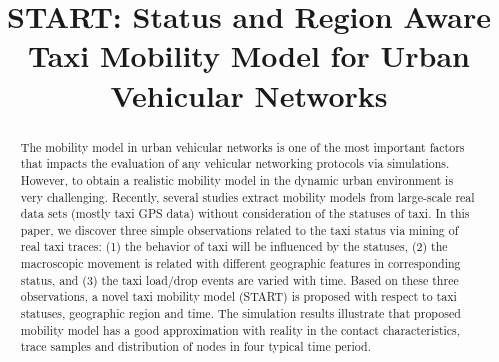 \documentclass[10pt,journal,compsocconf,letterpaper]{IEEEtran}
\begin{document}
\title{START: Status and Region Aware Taxi Mobility Model for Urban Vehicular Networks}

\author{
}
\maketitle

\begin{abstract}
The mobility model in urban vehicular networks is one of the most important factors that impacts the evaluation of any vehicular networking protocols via simulations. However, to obtain a realistic mobility model in the dynamic urban environment is very challenging. Recently, several studies extract mobility models from large-scale real data sets (mostly taxi GPS data) without consideration of the statuses of taxi. In this paper, we discover three simple observations related to the taxi status via mining of real taxi traces: (1) the behavior of taxi will be influenced by the statuses, (2) the macroscopic movement is related with different geographic features in corresponding status, and (3) the taxi load/drop events are varied with time. 
Based on these three observations, a novel taxi mobility model (START) is proposed with respect to taxi statuses, geographic region and time. The simulation results illustrate that proposed mobility model has a good approximation with reality in the contact characteristics, trace samples and distribution of nodes in four typical time period.
\end{abstract}
\end{document}
